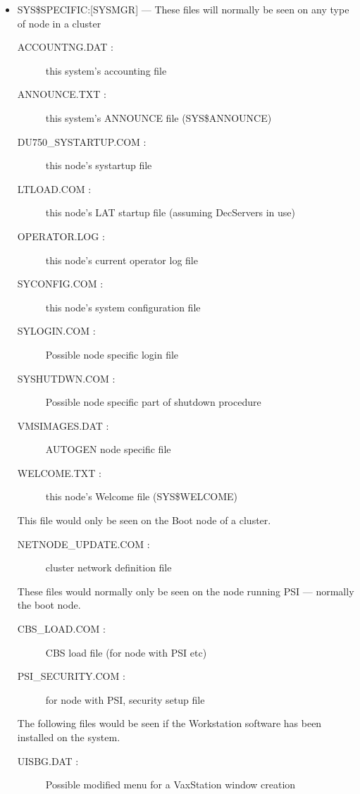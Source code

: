 \begin{itemize}
\item {SYS\$SPECIFIC:[SYSMGR]} ---
These files will normally be seen on any type of node in a cluster
\begin{description}
\item [ACCOUNTNG.DAT : ] this system's accounting file
\item [ANNOUNCE.TXT : ] this system's ANNOUNCE file (SYS\$ANNOUNCE)
\item [DU750\_SYSTARTUP.COM : ] this node's systartup file
\item [LTLOAD.COM : ] this node's LAT startup file (assuming DecServers in use)
\item [OPERATOR.LOG : ] this node's current operator log file
\item [SYCONFIG.COM : ] this node's system configuration file
\item [SYLOGIN.COM : ] Possible node specific login file
\item [SYSHUTDWN.COM :] Possible node specific part of shutdown procedure
\item [VMSIMAGES.DAT : ] AUTOGEN node specific file
\item [WELCOME.TXT : ] this node's Welcome file (SYS\$WELCOME)
\end{description}

This file would only be seen on the Boot node of a cluster.

\begin{description}
\item [NETNODE\_UPDATE.COM : ] cluster network definition file
\end{description}

These files would normally only be seen on the node running PSI --- normally the
boot node.

\begin{description}
\item [CBS\_LOAD.COM : ] CBS load file (for node with PSI etc)
\item [PSI\_SECURITY.COM : ] for node with PSI, security setup file
\end{description}
The following files would be seen if the Workstation software has been
installed on the system.
\begin{description}
\item [UISBG.DAT : ] Possible modified menu for a VaxStation window creation
\end{description}
\end{itemize}


